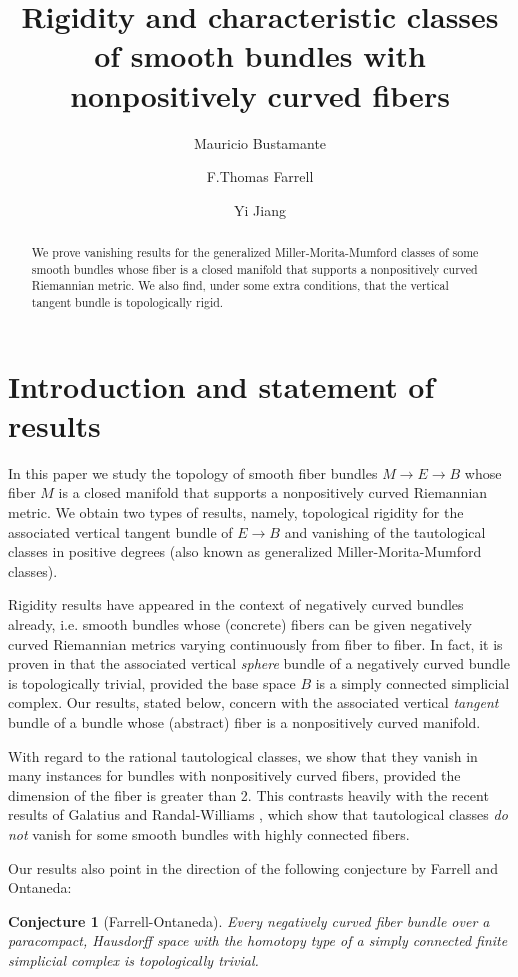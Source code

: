 \documentclass[onecolumn,notitlepage,11pt]{article}
\title{\Large\bf Rigidity and characteristic classes of smooth bundles with
nonpositively curved fibers}
\author{Mauricio Bustamante\and 
F.Thomas Farrell\and 
Yi Jiang}
\date{}
\newtheorem{conjecture}{Conjecture}
\theoremstyle{definition}
\begin{document}
\maketitle

\begin{abstract}
We prove vanishing results for the generalized Miller-Morita-Mumford
classes of some smooth bundles whose fiber is a closed manifold that supports a nonpositively curved Riemannian metric. We also find, under some extra conditions, that the vertical
tangent bundle is topologically rigid.
\end{abstract}
\section{Introduction and statement of results}
In this paper we study the topology of smooth fiber bundles $M\to E\to B$
whose fiber $M$ is a closed manifold that supports a nonpositively curved
Riemannian metric. We obtain two types of results, namely, topological
rigidity for the associated vertical tangent bundle of $E\to B$ and 
vanishing of the tautological classes in positive degrees (also known
as generalized Miller-Morita-Mumford classes).

Rigidity results have appeared in the context of 
negatively curved bundles already, 
i.e. smooth bundles
whose (concrete) fibers can be given 
negatively curved Riemannian metrics varying
continuously from fiber to fiber. In fact, it is proven in
\cite{FarrellGogolev} that the associated vertical \textit{sphere}
bundle of a 
negatively curved bundle is
topologically trivial, provided
the base space $B$ is a simply connected
simplicial complex. Our results, stated below, concern
with the associated vertical \textit{tangent}
bundle of a bundle whose
(abstract) fiber is a nonpositively curved manifold.

With regard to the rational tautological classes,
we show that they vanish
in many instances for bundles with
nonpositively curved fibers, provided
the dimension of the fiber is greater than 2.
This contrasts heavily with the recent results of 
Galatius and Randal-Williams \cite{GRW},
which show that tautological classes \textit{do not} vanish for
some smooth bundles 
with highly connected fibers.

Our results also point in the direction of the following conjecture
by Farrell and Ontaneda:
\begin{conjecture}[Farrell-Ontaneda]
Every negatively curved fiber bundle over a paracompact,
Hausdorff space 
with the homotopy type of a simply
connected finite simplicial complex is topologically trivial.
\end{conjecture}
\end{document}
